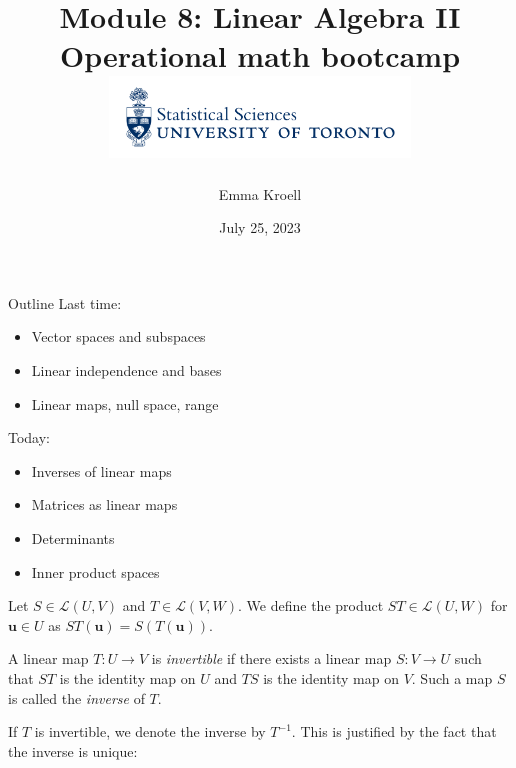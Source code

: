 \documentclass [aspectratio=169]{beamer}
\title[]{Module 8: Linear Algebra II \\ {\large Operational math bootcamp}\\ \includegraphics[width=8cm]{dept_logo.png}\vspace{-1em}}
\author[]{Emma Kroell}
\institute[]{University of Toronto}
\date{July 25, 2023}
\newcommand{\bu}{{\mathbf{u}}}
\newcommand{\cL}{{\mathcal{L}}}
\newcommand{\inv}{{-1}}
\begin{document}
{
\begin{frame}
    \titlepage
\end{frame}
}

\begin{frame}{Outline}
Last time:
    \begin{itemize}
      \setlength\itemsep{0.5em}
      \item Vector spaces and subspaces
    	\item Linear independence and bases
	\item Linear maps, null space, range
    \end{itemize}
    
\vspace{1.5em}

Today:
    \begin{itemize}
      \setlength\itemsep{0.5em}
      \item Inverses of linear maps
      	\item Matrices as linear maps
    	\item Determinants
	\item Inner product spaces
    \end{itemize}
\end{frame}

\begin{frame}
\begin{definition}
Let $S \in \cL(U,V)$ and $T \in \cL(V,W)$. We define the product $ST \in \cL(U,W)$ for $\bu\in U$ as $ST(\bu) = S(T(\bu))$.
\end{definition}

\begin{definition}
A linear map $T: U \to V$ is \emph{invertible} if there exists a linear map $S: V \to U$ such that $ST$ is the identity map on $U$ and $TS$ is the identity map on $V$. Such a map $S$ is called the \emph{inverse} of $T$. 
\end{definition}

If $T$ is invertible, we denote the inverse by $T^\inv$. This is justified by the fact that the inverse is unique:

\end{frame}
\end{document}
